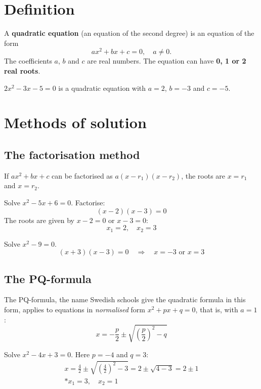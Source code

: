 
\section{Definition}
\label{c6:sec:definition}
A \textbf{quadratic equation} (an equation of the second degree) is an equation of the form
\[
  ax^2 + bx + c = 0, \quad a \neq 0.
\]
The coefficients $a$, $b$ and $c$ are real numbers. The equation can have \textbf{0, 1 or 2 real
roots}.

\begin{exempel}
$2x^2 - 3x - 5 = 0$ is a quadratic equation with $a = 2$, $b = -3$ and $c = -5$.
\end{exempel}

\section{Methods of solution}
\label{c6:sec:losningsmetoder}

\subsection{The factorisation method}
\label{c6:sec:faktorisering}
If $ax^2 + bx + c$ can be factorised as $a(x - r_1)(x - r_2)$, the roots are $x = r_1$ and
$x = r_2$.

\begin{exempel}
Solve $x^2 - 5x + 6 = 0$. Factorise:
\[
  (x - 2)(x - 3) = 0
\]
The roots are given by $x - 2 = 0$ or $x - 3 = 0$:
\[
  x_1 = 2, \quad x_2 = 3
\]
\end{exempel}

\begin{exempel}
Solve $x^2 - 9 = 0$.
\[
  (x + 3)(x - 3) = 0 \quad \Rightarrow \quad x = -3 \text{ or } x = 3
\]
\end{exempel}

\subsection{The PQ-formula}
\label{c6:sec:pq}
The PQ-formula, the name Swedish schools give the quadratic formula in this form, applies to
equations in \emph{normalised} form $x^2 + px + q = 0$, that is, with $a = 1$:
\[
  x = -\frac{p}{2} \pm \sqrt{\left(\frac{p}{2}\right)^2 - q}
\]

\begin{exempel}
Solve $x^2 - 4x + 3 = 0$. Here $p = -4$ and $q = 3$:
\begin{gather*}
  x = \frac{4}{2} \pm \sqrt{\left(\frac{4}{2}\right)^2 - 3} = 2 \pm \sqrt{4 - 3} = 2 \pm 1 \\*
  x_1 = 3, \quad x_2 = 1
\end{gather*}
\end{exempel}

